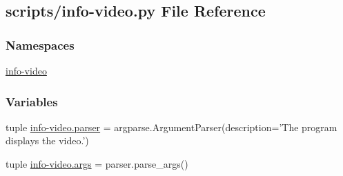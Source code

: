 \hypertarget{info-video_8py}{\subsection{scripts/info-\/video.py File Reference}
\label{info-video_8py}
}
\subsubsection*{Namespaces}
\begin{DoxyCompactItemize}
\item 
\hyperlink{namespaceinfo-video}{info-\/video}
\end{DoxyCompactItemize}
\subsubsection*{Variables}
\begin{DoxyCompactItemize}
\item 
tuple \hyperlink{namespaceinfo-video_abe4e1bf478ad1b6994b2fba0ee73cd87}{info-\/video.\-parser} = argparse.\-Argument\-Parser(description='The program displays the video.')
\item 
tuple \hyperlink{namespaceinfo-video_a3a00fb720e79cb58a6230233abc3a364}{info-\/video.\-args} = parser.\-parse\-\_\-args()
\end{DoxyCompactItemize}
